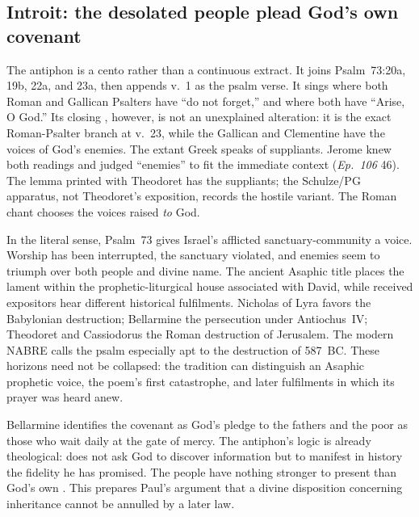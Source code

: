 \subsection*{Introit: the desolated people plead God's own covenant\enspace{}}

The antiphon is a cento rather than a continuous extract. It joins
Psalm~73:20a, 19b, 22a, and 23a, then appends v.~1 as the psalm verse. It sings
 where both Roman and Gallican Psalters have ``do not
forget,'' and  where both have ``Arise, O God.'' Its
closing , however, is not an unexplained alteration:
it is the exact Roman-Psalter branch at v.~23, while the Gallican and Clementine
have the voices of God's enemies. The extant Greek speaks of suppliants.
Jerome knew both readings and judged ``enemies'' to fit the immediate context
(\emph{Ep.~106} 46). The lemma printed with Theodoret has the suppliants; the
Schulze/PG apparatus, not Theodoret's exposition, records the hostile variant.
The Roman chant chooses the voices raised \emph{to} God.

In the literal sense, Psalm~73 gives Israel's afflicted sanctuary-community a
voice. Worship has been interrupted, the sanctuary violated, and enemies seem
to triumph over both people and divine name. The ancient Asaphic title places
the lament within the prophetic-liturgical house associated with David, while
received expositors hear different historical fulfilments. Nicholas of Lyra
favors the Babylonian destruction; Bellarmine the persecution under
Antiochus~IV; Theodoret and Cassiodorus the Roman destruction of Jerusalem.
The modern NABRE calls the psalm especially apt to the destruction of
587~BC. These horizons
need not be collapsed: the tradition can distinguish an Asaphic prophetic
voice, the poem's first catastrophe, and later fulfilments in which its prayer
was heard anew.

Bellarmine identifies the covenant as God's pledge to the fathers and the poor
as those who wait daily at the gate of mercy. The antiphon's logic is already
theological:  does not ask God to discover information but to
manifest in history the fidelity he has promised. The people have nothing
stronger to present than God's own . This prepares Paul's
argument that a divine disposition concerning inheritance cannot be annulled
by a later law.

